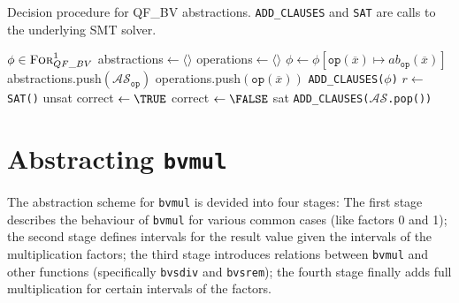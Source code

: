 \begin{algorithm}
    \caption{Decision procedure for QF\_BV abstractions. \texttt{ADD\_CLAUSES} and \texttt{SAT} are calls to the underlying SMT solver.}
    \begin{algorithmic}
    \label{algorithm:refinement_approach:abstraction_scheme:refinement}
    \REQUIRE $\phi \in \textsc{For}^1_{QF\_BV}$
    \STATE abstractions$ \leftarrow \langle\rangle$
    \STATE operations$ \leftarrow \langle\rangle$
                \STATE $\phi \leftarrow \phi\left[\texttt{op}\left(\overline{x}\right) \mapsto ab_\texttt{op}\left(\overline{x}\right)\right]$
                \STATE abstractions.push$\left(\mathcal{AS}_\texttt{op}\right)$
                \STATE operations.push$\left( \texttt{op}\left(\overline{x}\right) \right)$
            \ENDFOR
        \ENDIF
    \ENDFOR
    \STATE \texttt{ADD\_CLAUSES($\phi$)}
    \LOOP
    \STATE $r \leftarrow $\texttt{SAT()}
        \PRINT unsat
    \ELSE
        \STATE correct $\leftarrow \TRUE$
                \STATE correct $\leftarrow \FALSE$
            \ENDIF
        \ENDFOR
            \PRINT sat
        \ELSE
                \STATE \texttt{ADD\_CLAUSES($\mathcal{AS}$.pop())}
            \ENDFOR
        \ENDIF
    \ENDIF
    \ENDLOOP
    \end{algorithmic}
\end{algorithm}

\section{Abstracting \texttt{bvmul}}
\label{sec:refinement_approach:bvmul}
The abstraction scheme for \texttt{bvmul} is devided into four stages:
The first stage describes the behaviour of \texttt{bvmul} for various common cases (like factors 0 and 1);
the second stage defines intervals for the result value given the intervals of the multiplication factors;
the third stage introduces relations between \texttt{bvmul} and other functions (specifically \texttt{bvsdiv} and \texttt{bvsrem});
the fourth stage finally adds full multiplication for certain intervals of the factors.

